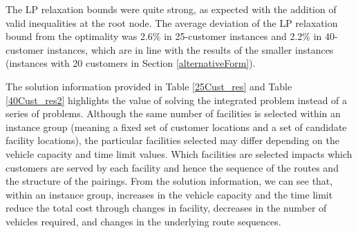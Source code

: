 \documentclass[11pt]{article}
\begin{document}
The LP relaxation bounds were quite strong, as expected with the addition of valid inequalities
at the root node. The average deviation of the LP relaxation bound from the optimality
was 2.6\% in 25-customer instances and 2.2\% in 40-customer instances, which are in line with 
the results of the smaller instances (instances with 20 customers in Section \ref{alternativeForm}).


The solution information provided in Table \ref{25Cust_res} and Table \ref{40Cust_res2} highlights
the value of solving the integrated problem instead of a series of problems.  Although the same number
of facilities is selected within an instance group (meaning a fixed set of customer locations and 
a set of candidate facility locations), the particular facilities selected may differ depending 
on the vehicle capacity and time limit values.  Which facilities are selected impacts which customers
are served by each facility and hence the sequence of the routes and the structure of the pairings.
From the solution information, we can see that, within an instance group, increases in the vehicle capacity
and the time limit reduce the total cost through changes in facility, decreases in the number of vehicles
required, and changes in the underlying route sequences.
\end{document}
